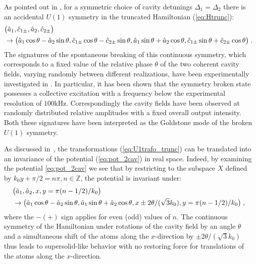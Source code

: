\documentclass[12pt]{iopart}
\begin{document}
As pointed out in \cite{leonard2016supersolid}, for a symmetric choice
of cavity detunings $\Delta_1=\Delta_2$ there is an accidental
$U(1)$ symmetry in the truncated Hamiltonian (\ref{eq:Htrunc}):
\begin{align}
\label{eq:U1trafo_trunc}
&\big(\hat{a}_1,\hat{c}_{1\pm},\hat{a}_2,\hat{c}_{2\pm}\big)\notag\\ &\to\big(\hat{a}_1\cos{\theta}-\hat{a}_2\sin{\theta},\hat{c}_{1\pm}\cos{\theta}-\hat{c}_{2\pm}\sin{\theta},\hat{a}_1\sin{\theta}+\hat{a}_2\cos{\theta},\hat{c}_{1\pm}\sin{\theta}+\hat{c}_{2\pm}\cos{\theta}\big)\;.
\end{align}
The signatures of the spontaneous breaking of this continuous symmetry, which corresponds to a fixed value of the relative phase $\theta$ of
the two coherent cavity fields, varying randomly between different realizations, have been experimentally investigated in
\cite{leonard2016supersolid,leonard_supersolid_goldstone}. In particular, it has been shown that the symmetry broken state possesses a collective excitation with a frequency below the experimental resolution of $100$kHz. Correspondingly the cavity fields have been observed at randomly distributed relative amplitudes with a fixed overall output intensity. Both these signatures have been interpreted as the Goldstone mode of the broken $U(1)$ symmetry.


As discussed in~\cite{leonard2016supersolid}, the transformations (\ref{eq:U1trafo_trunc}) can be translated
 into an invariance of the potential (\ref{eq:pot_2cav}) in real space. Indeed,  
by examining the potential \eqref{eq:pot_2cav} we see that by restricting
to the subspace $X$ defined by $k_0y+\pi/2=n\pi,n\in\mathbb{Z}$, the
potential is invariant under:
\begin{align}
\label{eq:U1trafo}
&\big (\hat{a}_1,\hat{a}_2,x,y=\pi(n-1/2)/k_0\big)\notag\\
&\to\big(\hat{a}_1\cos{\theta}-\hat{a}_2\sin{\theta},\hat{a}_1\sin{\theta}+\hat{a}_2\cos{\theta}, x\pm2\theta/(\sqrt{3}k_0),y=\pi(n-1/2)/k_0\big)\;,
\end{align}
where the $-(+)$ sign applies for even (odd) values of $n$.
The continuous symmetry of the Hamiltonian under rotations of the cavity field by an angle $\theta$ and a simultaneous shift of the atoms along the $x$-direction by $\pm2\theta/\left(\sqrt{3}k_0\right)$ thus leads to supersolid-like behavior with no restoring force for translations of the atoms along the $x$-direction.
\end{document}

